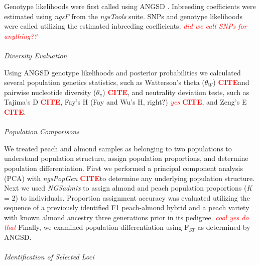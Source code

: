 \documentclass[12pt]{article}
\newcommand{\citex}{\textcolor{red}{\bf CITE}}
\newcommand{\jri}[1]{\textcolor{red}{ \emph{ #1}} }
\begin{document}
%
%
%
Genotype likelihoods were first called using ANGSD \citep{korneliussen2014angsd}.
%
Inbreeding coefficients were estimated using \emph{ngsF} from the \emph{ngsTools} \citep{fumagalli2014ngstools} suite.
%
SNPs and genotype likelihoods were called utilizing the estimated inbreeding coefficients. \jri{did we call SNPs for anything??}
\\
%
\\
\emph{Diversity Evaluation}

Using ANGSD genotype likelihoods and posterior probabilities we calculated several population genetics statistics, such as Watterson's theta ($\theta_{W}$) \citex and pairwise nucleotide diversity ($\theta_{\pi}$) \citex, and neutrality deviation tests, such as Tajima's D \citex, Fay's H (Fay and Wu's H, right?) \jri{yes} \citex, and Zeng's E \citex.
\\
%
\\
\emph{Population Comparisons}

We treated peach and almond samples as belonging to two populations to understand population structure, assign population proportions, and determine population differentiation.
%
First we performed a principal component analysis (PCA) with \emph{ngsPopGen} \citex to determine any underlying population structure.
%
Next we used \emph{NGSadmix} \citep{skotte2013estimating} to assign almond and peach population proportions (\emph{K} = 2) to individuals. 
%
Proportion assignment accuracy was evaluated utilizing the sequence of a previously identified F1 peach-almond hybrid and a peach variety with known almond ancestry three generations prior in its pedigree. \jri{cool yes do that}
%
Finally, we examined population differentiation using F$_{ST}$ as determined by ANGSD.
%
\\
%
\\
\emph{Identification of Selected Loci}
\end{document}
